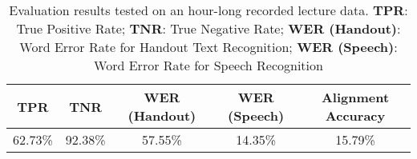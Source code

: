 \documentclass[12pt]{article}
\begin{document}
\begin{appendices}
\begin{table}[!htb]
    \centering
    \begin{tabular}{|c|c|c|c|c|}
        \hline
        TPR & TNR & WER (Handout) & WER (Speech) & Alignment Accuracy \\ \hline
        62.73\% & 92.38\% & 57.55\% & 14.35\% & 15.79\% \\ \hline
    \end{tabular}
    \caption{Evaluation results tested on an hour-long recorded lecture data. \textbf{TPR}: True Positive Rate; \textbf{TNR}: True Negative Rate; \textbf{WER (Handout)}: Word Error Rate for Handout Text Recognition; \textbf{WER (Speech)}: Word Error Rate for Speech Recognition}
    \label{tab:eval}
\end{table}
    
\end{appendices}
\end{document}
